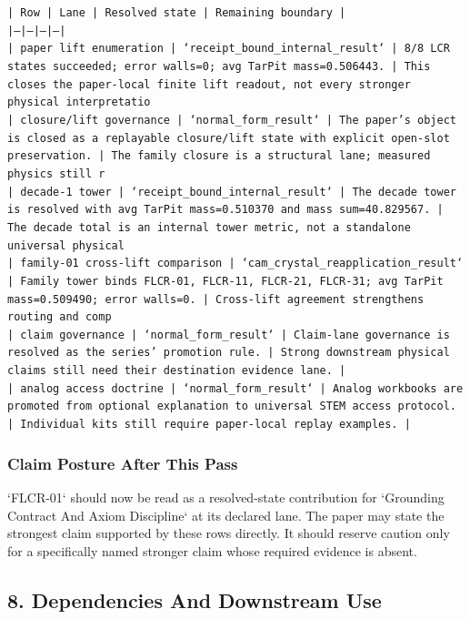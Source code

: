 \documentclass[11pt]{article}
\begin{document}
\noindent\texttt{| Row | Lane | Resolved state | Remaining boundary |}\\
\noindent\texttt{|---|---|---|---|}\\
\noindent\texttt{| paper lift enumeration | `receipt\_bound\_internal\_result` | 8/8 LCR states succeeded; error walls=0; avg TarPit mass=0.506443. | This closes the paper-local finite lift readout, not every stronger physical interpretatio}\\
\noindent\texttt{| closure/lift governance | `normal\_form\_result` | The paper's object is closed as a replayable closure/lift state with explicit open-slot preservation. | The family closure is a structural lane; measured physics still r}\\
\noindent\texttt{| decade-1 tower | `receipt\_bound\_internal\_result` | The decade tower is resolved with avg TarPit mass=0.510370 and mass sum=40.829567. | The decade total is an internal tower metric, not a standalone universal physical }\\
\noindent\texttt{| family-01 cross-lift comparison | `cam\_crystal\_reapplication\_result` | Family tower binds FLCR-01, FLCR-11, FLCR-21, FLCR-31; avg TarPit mass=0.509490; error walls=0. | Cross-lift agreement strengthens routing and comp}\\
\noindent\texttt{| claim governance | `normal\_form\_result` | Claim-lane governance is resolved as the series' promotion rule. | Strong downstream physical claims still need their destination evidence lane. |}\\
\noindent\texttt{| analog access doctrine | `normal\_form\_result` | Analog workbooks are promoted from optional explanation to universal STEM access protocol. | Individual kits still require paper-local replay examples. |}\\

\subsubsection*{Claim Posture After This Pass}

`FLCR-01` should now be read as a resolved-state contribution for `Grounding Contract And Axiom Discipline` at its declared lane. The paper may state the strongest claim supported by these rows directly. It should reserve caution only for a specifically named stronger claim whose required evidence is absent.

\subsection*{8. Dependencies And Downstream Use}
\end{document}
